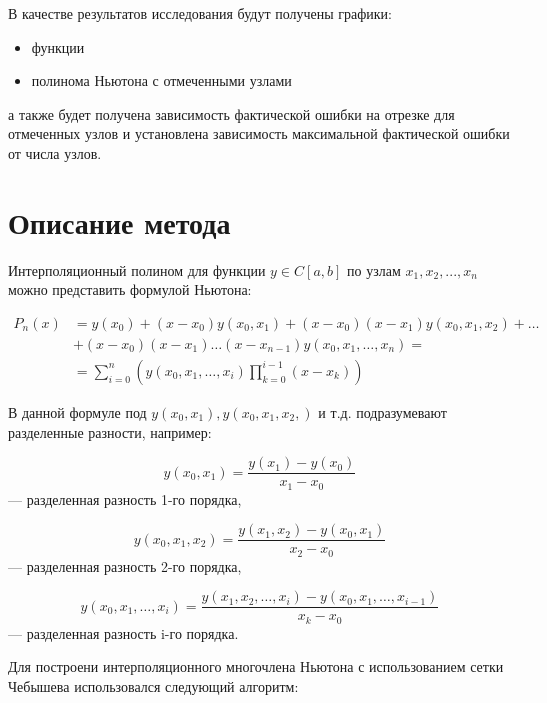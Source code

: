 \documentclass{article}
\begin{document}
В качестве результатов исследования будут получены графики:

\begin{itemize}
    \item функции
    \item полинома Ньютона с отмеченными узлами
\end{itemize}

а также будет получена зависимость фактической ошибки на отрезке для отмеченных узлов и установлена зависимость максимальной фактической ошибки от числа узлов.

\section{Описание метода}

Интерполяционный полином для функции $y \in C[a, b]$ по узлам
$x_1, x_2, ... ,\allowbreak x_n$ можно представить формулой Ньютона:

\begin{equation}
\begin{split}
P_n(x) &= y(x_0) + (x - x_0) y(x_0, x_1) + (x - x_0)(x - x_1) y(x_0, x_1, x_2) + \dots \\
& + (x - x_0)(x - x_1) \dots (x - x_{n-1}) y(x_0, x_1, \dots, x_n) = \\
& = \sum_{i=0}^{n} (y(x_0, x_1, \dots, x_i) \prod_{k=0}^{i-1} (x - x_k))
\end{split}
\end{equation}

В данной формуле под $y(x_0,x_1), y(x_0,x_1,x_2,)$ и т.д. подразумевают разделенные разности, например:

\begin{equation}
y(x_0,x_1) = \frac{y(x_1) - y(x_0)}{x_1-x_0}
\end{equation} --- разделенная разность 1-го порядка,

\begin{equation}
y(x_0,x_1,x_2) = \frac{y(x_1,x_2) - y(x_0,x_1)}{x_2-x_0}
\end{equation} --- разделенная разность 2-го порядка,

\begin{equation}
y(x_0,x_1,\dots,x_i) = \frac{y(x_1,x_2,\dots,x_i) - y(x_0,x_1,\dots,x_{i-1})}{x_k-x_0}
\end{equation} --- разделенная разность i-го порядка.

\bigskip

Для построени интерполяционного многочлена Ньютона с использованием сетки Чебышева использовался следующий алгоритм:
\end{document}
